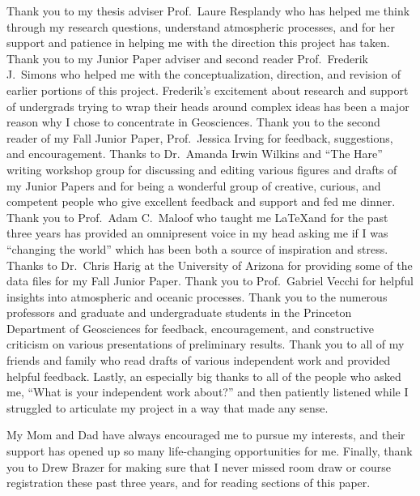 
Thank you to my thesis adviser Prof.~Laure Resplandy who has helped me think through my research questions, understand atmospheric processes, and for her support and patience in helping me with the direction this project has taken.
Thank you to my Junior Paper adviser and second reader Prof.~Frederik J.~Simons who helped me with
the conceptualization, direction, and revision of earlier portions of this project. Frederik's excitement about research and support of undergrads trying to wrap their heads around complex ideas has been a major reason why I chose to concentrate in Geosciences. Thank you to the second reader of my Fall Junior Paper, Prof.~Jessica Irving for feedback, suggestions, and encouragement. Thanks to Dr.~Amanda
Irwin Wilkins and ``The Hare'' writing workshop group for discussing
and editing various figures and drafts of my Junior Papers and for being a wonderful group of creative, curious, and competent people who give excellent feedback and support and fed me dinner. Thank you to Prof.~Adam C.~Maloof who taught me \LaTeX and for the past three years has provided an omnipresent voice in my head asking me if I was ``changing the world'' which has been both a source of inspiration and stress. Thanks to Dr.~Chris Harig at the University of Arizona for providing some of the data files for my Fall Junior Paper. Thank you to Prof.~Gabriel Vecchi for helpful insights into atmospheric and oceanic processes. Thank you to the numerous professors and graduate and undergraduate students in the Princeton Department of Geosciences for feedback, encouragement, and constructive criticism on various presentations of preliminary results. Thank you to all of my friends and family who read drafts of various independent work and provided helpful feedback. Lastly, an especially big thanks to all of the people who asked me, ``What is your independent work about?'' and then patiently listened while I struggled to articulate my project in a way that made any sense.

My Mom and Dad have always encouraged me to pursue my interests, and their support has opened up so many life-changing opportunities for me. Finally, thank you to Drew Brazer for making sure that I never missed room draw or course registration these past three years, and for reading sections of this paper.


